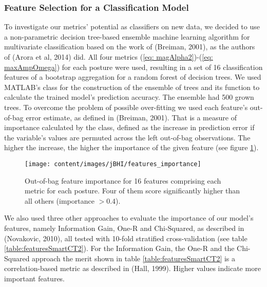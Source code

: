 \subsubsection{Feature Selection for a Classification Model}
\label{subsubsec:SmartCT2Features}
To investigate our metrics' potential as classifiers on new data, we decided to use a non-parametric decision tree-based ensemble machine learning algorithm for multivariate classification based on the work of (Breiman, 2001), as the authors of (Arora et al, 2014) did. All four metrics (\ref{eq: magAlpha2})-(\ref{eq: maxAmpOmega}) for each posture were used, resulting in a set of 16 classification features of a bootstrap aggregation for a random forest of decision trees. We used MATLAB's  class for the construction of the ensemble of trees and its function  to calculate the trained model's prediction accuracy. The ensemble had 500 grown trees. To overcome the problem of possible over-fitting we used each feature's out-of-bag error estimate, as defined in (Breiman, 2001). That is a measure of importance calculated by the  class, defined as the increase in prediction error if the variable's values are permuted across the left out-of-bag observations. The higher the increase, the higher the importance of the given feature (see figure \ref{fig:featuresSmartCT2}). 


\begin{figure}[h]
	\centering
	\texttt{[image: content/images/jBHI/features\_importance]}
	\caption{Out-of-bag feature importance for 16 features comprising each metric for each posture. Four of them score significantly higher than all others (importance $> 0.4$).}
	\label{fig:featuresSmartCT2}
\end{figure}

We also used three other approaches to evaluate the importance of our model's features, namely Information Gain, One-R and Chi-Squared, as described in (Novakovic, 2010), all tested with 10-fold stratified cross-validation (see table \ref{table:featuresSmartCT2}). For the Information Gain, the One-R and the Chi-Squared approach the merit shown in table \ref{table:featuresSmartCT2} is a correlation-based metric as described in (Hall, 1999). Higher values indicate more important features. 

